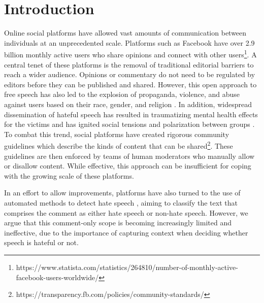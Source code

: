 \documentclass[letterpaper]{article} %
\begin{document}
\section{Introduction}
Online social platforms have allowed vast amounts of communication between individuals at an unprecedented scale. Platforms such as Facebook have over 2.9 billion monthly active users who share opinions and connect with other users\footnote{https://www.statista.com/statistics/264810/number-of-monthly-active-facebook-users-worldwide/}. A central tenet of these platforms is the removal of traditional editorial barriers to reach a wider audience. Opinions or commentary do not need to be regulated by editors before they can be published and shared. However, this open approach to free speech has also led to the explosion of propaganda, violence, and abuse against users based on their race, gender, and religion \cite{das2020hate}. In addition, widespread dissemination of hateful speech has resulted in traumatizing mental health effects for the victims \cite{janikke2019hate} and has ignited social tensions and polarization between groups \cite{Waller2021}. To combat this trend, social platforms have created rigorous community guidelines which describe the kinds of content that can be shared\footnote{https://transparency.fb.com/policies/community-standards/}. These guidelines are then enforced by teams of human moderators who manually allow or disallow content. While effective, this approach can be insufficient for coping with the growing scale of these platforms. %

In an effort to allow improvements, platforms have also turned to the use of automated methods to detect hate speech \cite{das2022data, mathew2021hatexplain}, aiming to classify the text that comprises the comment as either hate speech or non-hate speech. However, we argue that this comment-only scope is becoming increasingly limited and ineffective, due to the importance of capturing context when deciding whether speech is hateful or not.
\end{document}
